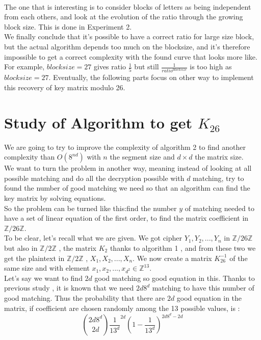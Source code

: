 \documentclass{article}
\begin{document}
\\
The one that is interesting is to consider blocks of letters as being independent from each others, and look at the evolution of the ratio through the growing block size. This is done in Experiment 2.\\
We finally conclude that it's possible to have a correct ratio for large size block, but the actual algorithm depends too much on the blocksize, and it's therefore impossible to get a correct complexity with the found curve that looks more like. For example, $blocksize=27$ gives ratio $\frac{1}{5}$ but still $\frac{1}{ratio^{blocksize}}$ is too high as $blocksize = 27$.
Eventually, the following parts focus on other way to implement this recovery of key matrix modulo 26.\\

\section{Study of Algorithm to get $K_{26}$}
We are going to try to improve the complexity of algorithm 2 to find another complexity than $O(8^{nd})$ with $n$ the segment size and $d \times d$ the matrix size.\\
We want to turn the problem in another way, meaning instead of looking at all possible matching and do all the decryption possible with $d$ matching, try to found the number of good matching we need so that an algorithm can find the key matrix by solving equations.\\
So the problem can be turned like this:find the number $y$ of matching needed to have a set of linear equation of the first order, to find the matrix coefficient in $\mathbb{Z}/26\mathbb{Z}$.\\
To be clear, let's recall what we are given. We got cipher $Y_1 , Y_2 , ... , Y_n$ in $\mathbb{Z}/26\mathbb{Z}$ but also in $\mathbb{Z}/2\mathbb{Z}$ , the matrix $K_2$ thanks to algorithm 1 , and from these two we get the plaintext in $\mathbb{Z}/2\mathbb{Z}$ , $X_1,X_2,...,X_n$. We now create a matrix $K_{26}^{-1}$ of the same size and with element $x_1 , x_2 , ... , x_{d^2} \in \mathbb{Z}^{13}$.\\
Let's say we want to find $2d$ good matching so good equation in this. Thanks to previous study , it is known that we need $2d8^d$ matching to have this number of good matching. Thus the probability that there are $2d$ good equation in the matrix, if coefficient are chosen randomly among the 13 possible values, is : $$ {2d8^d \choose 2d} \frac{1}{13^d}^{2d} (1-\frac{1}{13^d})^{2d8^d - 2d}$$\\
\end{document}
